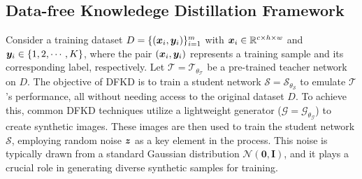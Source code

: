 \documentclass{article} %
\newcommand{\nbc}[3]{
        {\colorbox{#3}{\scriptsize\textcolor{white}{#1}}}
            {\textcolor{#3}{\small$\blacktriangleright$\textit{#2}$\blacktriangleleft$}}
}
\newcommand{\MTH}[1]{\nbc{Mehrtash}{#1}{purple}}
\begin{document}
\subsection{Data-free Knowledege Distillation Framework}
%
%
Consider a training dataset $D =\{ ({\bm{x}}_i, {\bm{y}}_i)\}_{i=1}^m $ with ${\bm{x}}_i \in \mathbb{R}^{c \times h \times w}$ and ${\bm{y}}_i \in \{1,2,\cdots,K\}$, where the pair $({\bm{x}}_i, {\bm{y}}_i)$ represents a training sample and its corresponding label, respectively. Let $\mathcal{T}=\mathcal{T}_{\theta_\mathcal{T}}$ be a pre-trained teacher network on $D$. The objective of DFKD is to train a student network $\mathcal{S}=\mathcal{S}_{\theta_\mathcal{S}}$ to emulate $\mathcal{T}$'s performance, all without needing access to the original dataset $D$. To achieve this, common DFKD techniques utilize a lightweight generator ($\mathcal{G}=\mathcal{G}_{\theta_\mathcal{G}}$) to create synthetic images. These images are then used to train the student network $\mathcal{S}$, employing random noise ${\bm{z}}$ as a key element in the process. This noise is typically drawn from a standard Gaussian distribution $\mathcal{N}(\boldsymbol{0}, \mathbf{I})$, and it plays a crucial role in generating diverse synthetic samples for training.
\end{document}
